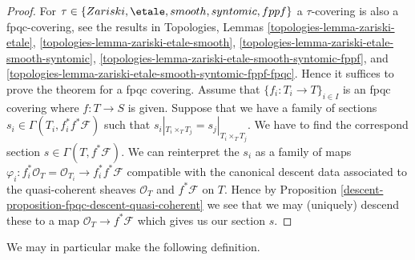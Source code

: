 \begin{proof}

For $\tau \in \{Zariski, \linebreak[0] \etale, \linebreak[0] smooth,
\linebreak[0] syntomic, \linebreak[0] fppf\}$ a $\tau$-covering
is also a fpqc-covering, see the results in
Topologies, Lemmas
\ref{topologies-lemma-zariski-etale},
\ref{topologies-lemma-zariski-etale-smooth},
\ref{topologies-lemma-zariski-etale-smooth-syntomic},
\ref{topologies-lemma-zariski-etale-smooth-syntomic-fppf}, and
\ref{topologies-lemma-zariski-etale-smooth-syntomic-fppf-fpqc}.
Hence it suffices to prove the theorem
for a fpqc covering. Assume that $\{f_i : T_i \to T\}_{i \in I}$
is an fpqc covering where $f : T \to S$ is given. Suppose that
we have a family of sections $s_i \in \Gamma(T_i , f_i^*f^*\mathcal{F})$
such that $s_i|_{T_i \times_T T_j} = s_j|_{T_i \times_T T_j}$.
We have to find the correspond section $s \in \Gamma(T, f^*\mathcal{F})$.
We can reinterpret the $s_i$ as a family of maps
$\varphi_i : f_i^*\mathcal{O}_T = \mathcal{O}_{T_i} \to f_i^*f^*\mathcal{F}$
compatible with the canonical descent data associated to the
quasi-coherent sheaves $\mathcal{O}_T$ and $f^*\mathcal{F}$ on $T$.
Hence by Proposition \ref{descent-proposition-fpqc-descent-quasi-coherent}
we see that we may (uniquely) descend
these to a map $\mathcal{O}_T \to f^*\mathcal{F}$ which gives
us our section $s$.
\end{proof}

We may in particular make the following definition.

